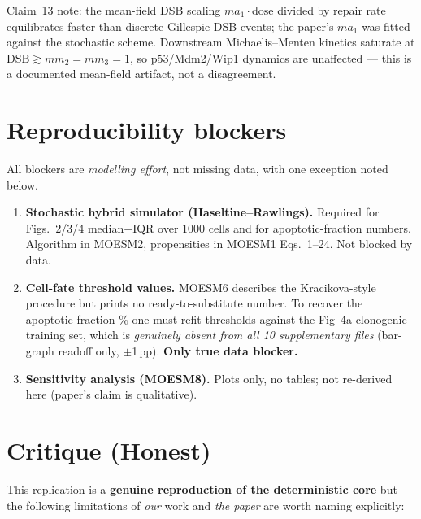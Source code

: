 \documentclass[11pt]{article}
\begin{document}
Claim~13 note: the mean-field DSB scaling $ma_1 \cdot \mathrm{dose}$ divided by
repair rate equilibrates faster than discrete Gillespie DSB events; the paper's
$ma_1$ was fitted against the stochastic scheme. Downstream Michaelis--Menten
kinetics saturate at $\mathrm{DSB} \gtrsim mm_2 = mm_3 = 1$, so p53/Mdm2/Wip1
dynamics are unaffected --- this is a documented mean-field artifact, not a
disagreement.

\section{Reproducibility blockers}
All blockers are \emph{modelling effort}, not missing data, with one exception
noted below.
\begin{enumerate}
  \item \textbf{Stochastic hybrid simulator (Haseltine--Rawlings).} Required
        for Figs.~2/3/4 median$\pm$IQR over 1000 cells and for apoptotic-fraction
        numbers. Algorithm in MOESM2, propensities in MOESM1 Eqs.~1--24. Not
        blocked by data.
  \item \textbf{Cell-fate threshold values.} MOESM6 describes the Kracikova-style
        procedure but prints no ready-to-substitute number. To recover the
        apoptotic-fraction \% one must refit thresholds against the Fig~4a
        clonogenic training set, which is \emph{genuinely absent from all 10
        supplementary files} (bar-graph readoff only, $\pm$1\,pp).
        \textbf{Only true data blocker.}
  \item \textbf{Sensitivity analysis (MOESM8).} Plots only, no tables; not
        re-derived here (paper's claim is qualitative).
\end{enumerate}

\section{Critique (Honest)}
\label{sec:critique}
This replication is a \textbf{genuine reproduction of the deterministic core}
but the following limitations of \emph{our} work and \emph{the paper} are worth
naming explicitly:
\end{document}

